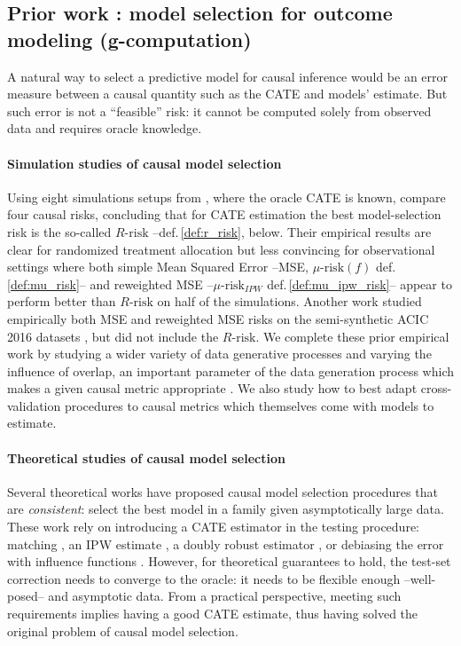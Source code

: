 \documentclass[a4paper,num-refs]{oup-contemporary}%
\begin{document}
\subsection{Prior work : model selection for outcome modeling (g-computation)}\label{apd:prior_work}

A natural way to select a predictive model for causal inference would be
an error measure between a causal quantity such as the CATE and models' estimate. But such error is
not a ``feasible'' risk: it cannot be computed solely from observed data
and requires oracle knowledge.


\paragraph{Simulation studies of causal model selection}

Using eight simulations setups from \cite{powers_methods_2018}, where
the oracle CATE is known, \cite{schuler_comparison_2018} compare four
causal risks, concluding that for CATE estimation the best
model-selection risk is the so-called $R\text{-risk}$
\cite{nie_quasioracle_2017} --def.\,\ref{def:r_risk}, below. Their
empirical results are clear for randomized treatment allocation but less
convincing for observational settings where both simple Mean Squared
Error --MSE, $\mu\text{-risk}(f)$ def.\,\ref{def:mu_risk}-- and
reweighted MSE --$\mu\text{-risk}_{IPW}$ def.\,\ref{def:mu_ipw_risk}--
appear to perform better than $R\text{-risk}$ on half of the simulations.
Another work \cite{alaa_validating_2019} studied empirically both MSE and
reweighted MSE risks on the semi-synthetic ACIC 2016 datasets
\cite{dorie_automated_2019}, but did not include the $R\text{-risk}$. We complete these
prior empirical work by studying a wider variety of data generative
processes and varying the influence of overlap, an important parameter of
the data generation process which makes a given causal metric appropriate
\cite{damour_overlap_2020}. We also study how to best adapt
cross-validation procedures to causal metrics which themselves come with
models to estimate.

\paragraph{Theoretical studies of causal model selection}

Several theoretical works have proposed causal model selection procedures
that are \emph{consistent}: select the best model in a family given
asymptotically large data. These work rely on introducing a
CATE estimator in the testing procedure: matching
\cite{rolling_model_2014}, an IPW estimate
\cite{gutierrez_causal_2016}, a doubly robust estimator
\cite{saito_counterfactual_2020}, or debiasing the error with influence
functions \cite{alaa_validating_2019}. However, for theoretical
guarantees to hold, the test-set correction needs to converge to the
oracle: it needs to be flexible enough --well-posed-- and asymptotic
data. From a practical perspective, meeting such requirements
implies having a good CATE estimate, thus having solved
the original problem of causal model selection.
\end{document}

